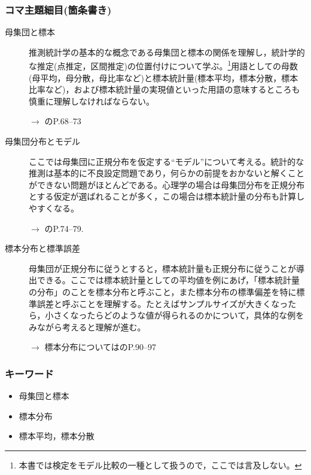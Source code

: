 \subsubsection{コマ主題細目(箇条書き)}
\begin{description}
\item[母集団と標本]推測統計学の基本的な概念である母集団と標本の関係を理解し，統計学的な推定(点推定，区間推定)の位置付けについて学ぶ。\footnote{本書では検定をモデル比較の一種として扱うので，ここでは言及しない。}用語としての母数(母平均，母分散，母比率など)と標本統計量(標本平均，標本分散，標本比率など)，および標本統計量の実現値といった用語の意味するところも慎重に理解しなければならない。
    \begin{flushright}
        $\to$ \citet{Yamada2004}のP.68--73
    \end{flushright}

\item[母集団分布とモデル]ここでは母集団に正規分布を仮定する``モデル''について考える。統計的な推測は基本的に不良設定問題であり，何らかの前提をおかないと解くことができない問題がほとんどである。心理学の場合は母集団分布を正規分布とする仮定が選ばれることが多く，この場合は標本統計量の分布も計算しやすくなる。
\begin{flushright}
    $\to$ \citet{Yamada2004}のP.74--79.
\end{flushright}

\item[標本分布と標準誤差]母集団が正規分布に従うとすると，標本統計量も正規分布に従うことが導出できる。ここでは標本統計量としての平均値を例にあげ，「標本統計量の分布」のことを標本分布と呼ぶこと，また標本分布の標準偏差を特に標準誤差と呼ぶことを理解する。たとえばサンプルサイズが大きくなったら，小さくなったらどのような値が得られるのかについて，具体的な例をみながら考えると理解が進む。
\begin{flushright}
    $\to$ 標本分布については\citet{Yamada2004}のP.90--97
\end{flushright}

\end{description}
\subsubsection{キーワード}
\begin{itemize}
\item 母集団と標本
\item 標本分布
\item 標本平均，標本分散
\end{itemize}
